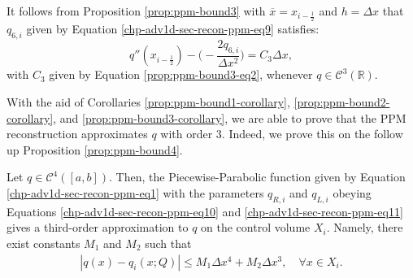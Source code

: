 \begin{corollary}
	\label{prop:ppm-bound3-corollary}
	It follows from Proposition \ref{prop:ppm-bound3} with 
	$\overline{x} = x_{i-\frac{1}{2}}$ and $h = \Delta x$
	that $q_{6,i}$ given by Equation \eqref{chp-adv1d-sec-recon-ppm-eq9} satisfies:
	\begin{equation}
		\label{ppm-edges-bound3}
		q''(x_{i-\frac{1}{2}}) -\bigg(-\frac{2q_{6, i}}{\Delta x^2}\bigg) = C_3\Delta x,
	\end{equation}
	with $C_3$ given by Equation \eqref{prop:ppm-bound3-eq2}, whenever $q \in \mathcal{C}^3(\mathbb{R})$.
\end{corollary}
With the aid of Corollaries \ref{prop:ppm-bound1-corollary}, \ref{prop:ppm-bound2-corollary},
and  \ref{prop:ppm-bound3-corollary}, we are able to prove
that the PPM reconstruction approximates $q$ with order 3.
Indeed, we prove this on the follow up Proposition \ref{prop:ppm-bound4}.
\begin{prop}
	\label{prop:ppm-bound4}
	Let $q \in \mathcal{C}^{4}([a,b])$.
	Then, the Piecewise-Parabolic function given by
	Equation \eqref{chp-adv1d-sec-recon-ppm-eq1} with 
	the parameters $q_{R,i}$ and $q_{L,i}$ obeying Equations
	\eqref{chp-adv1d-sec-recon-ppm-eq10} and \eqref{chp-adv1d-sec-recon-ppm-eq11}
	gives a third-order approximation to $q$ on the control volume $X_i$.
	Namely, there exist constants $M_1$ and $M_2$ such that
	\begin{equation*}
		\begin{split}
			|q(x)-q_i(x;Q)| \leq  M_1 \Delta x ^4 + M_2 \Delta x ^3, \quad \forall x \in X_i.
		\end{split}
	\end{equation*}
\end{prop}

